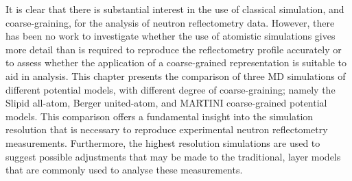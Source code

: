 It is clear that there is substantial interest in the use of classical simulation, and coarse-graining, for the analysis of neutron reflectometry data.
However, there has been no work to investigate whether the use of atomistic simulations gives more detail than is required to reproduce the reflectometry profile accurately or to assess whether the application of a coarse-grained representation is suitable to aid in analysis.
This chapter presents the comparison of three MD simulations of different potential models, with different degree of coarse-graining; namely the Slipid all-atom,\autocite{jambeck_derivation_2012} Berger united-atom,\autocite{berger_molecular_1997} and MARTINI coarse-grained potential models.\cite{marrink_martini_2007}
This comparison offers a fundamental insight into the simulation resolution that is necessary to reproduce experimental neutron reflectometry measurements.
Furthermore, the highest resolution simulations are used to suggest possible adjustments that may be made to the traditional, layer models that are commonly used to analyse these measurements.
